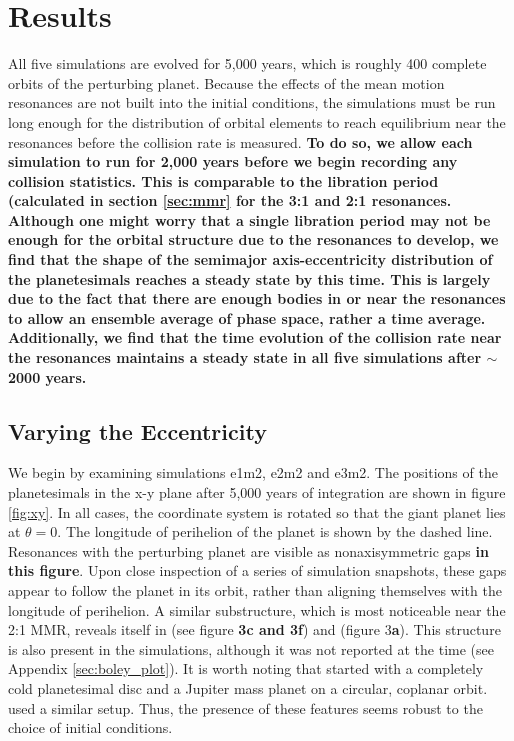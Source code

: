 \documentclass[fleqn,usenatbib]{mnras}
\begin{document}
\section{Results} \label{sec:results}

All five simulations are evolved for 5,000 years, which is roughly 400 complete orbits of the perturbing planet. Because the effects of the mean 
motion resonances are not built into the initial conditions, the simulations must be run long enough for the distribution of orbital elements to reach 
equilibrium near the resonances before the collision rate is measured. \textbf{To do so, we allow each simulation to run for 2,000 years before we begin recording any collision statistics. This is comparable to the libration period (calculated in section \ref{sec:mmr} for the 3:1 and 2:1 resonances. Although one might worry that a single libration period may not be enough for the orbital structure due to the resonances to develop, we find that the shape of the semimajor axis-eccentricity distribution of the planetesimals reaches a steady state by this time. This is largely due to the fact that there are enough bodies in or near the resonances to allow an ensemble average of phase space, rather a time average. Additionally, we find that the time evolution of the collision rate near the resonances maintains a steady state in all five simulations after $\sim$ 2000 years.}

\subsection{Varying the Eccentricity} \label{sec:vary_ecc}

We begin by examining simulations e1m2, e2m2 and e3m2. The positions of the planetesimals in the x-y plane after 5,000 years of integration are 
shown in figure \ref{fig:xy}. In all cases, the coordinate system is rotated so that the giant planet lies at $\theta = 0$. The longitude of perihelion of 
the planet is shown by the dashed line. Resonances with the perturbing planet are visible as nonaxisymmetric gaps \textbf{in this figure}. Upon close inspection of a 
series of simulation snapshots, these gaps appear to follow the planet in its orbit, rather than aligning themselves with the longitude of perihelion. A 
similar substructure, which is most noticeable near the 2:1 MMR, reveals itself in \citet{2000Icar..143...45R} (see figure \textbf{3c and 3f}) and 
\citet{2016ApJ...818..159T} (figure 3\textbf{a}). This structure is also present in the \citet{2017ApJ...850..103B} simulations, although it was not reported at the 
time (see Appendix \ref{sec:boley_plot}). It is worth noting that \citet{2000Icar..143...45R} started with a completely cold planetesimal disc and a 
Jupiter mass planet on a circular, coplanar
orbit. \citet{2017ApJ...850..103B} used a similar setup.
Thus, the presence of these features seems robust 
to the choice of initial conditions.
\end{document}

